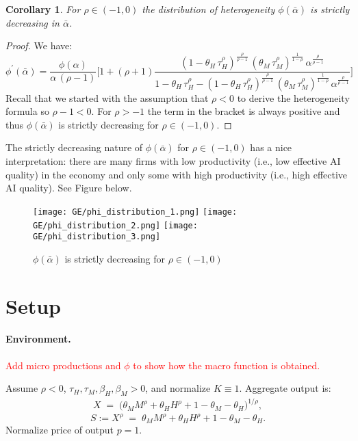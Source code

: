 \documentclass[english]{article}
\newtheorem{corollary}{Corollary}
\begin{document}
\begin{corollary}
For $\rho \in (-1,0)$ the distribution of heterogeneity $\phi(\bar{\alpha})$ is strictly decreasing in $\bar{\alpha}$. 
\end{corollary}

\begin{proof}
We have:
\[
\phi^{'}(\bar{\alpha}) = \frac{\phi(\alpha)}{\alpha\,(\rho-1)}\Big[1+(\rho+1)\frac{(1-\theta_H\,\tau_H^\rho)^\frac{\rho}{\rho-1}\,(\theta_M\,\tau_M^\rho)^{\frac{1}{1-\rho}}\,\alpha^{\frac{\rho}{\rho-1}}}{1-\theta_H\,\tau_H^\rho-(1-\theta_H\,\tau_H^\rho)^\frac{\rho}{\rho-1}\,(\theta_M\,\tau_M^\rho)^{\frac{1}{1-\rho}}\,\alpha^{\frac{\rho}{\rho-1}}}\Big]
\]
Recall that we started with the assumption that $\rho < 0$ to derive the heterogeneity formula so $\rho - 1 < 0$.
For $\rho > -1$ the term in the bracket is always positive and thus $\phi(\bar{\alpha})$ is strictly decreasing for $\rho \in (-1,0)$.
\end{proof}

The strictly decreasing nature of $\phi(\bar{\alpha})$ for $\rho \in (-1,0)$ has a nice interpretation: there are many firms with low productivity (i.e., low effective AI quality) in the economy and only some with high productivity (i.e., high effective AI quality). See Figure below.

\begin{figure}[h!]
    \centering
    \caption{$\phi(\bar{\alpha})$ is strictly decreasing for $\rho \in (-1,0)$}
    \texttt{[image: GE/phi\_distribution\_1.png]}
    \texttt{[image: GE/phi\_distribution\_2.png]}
    \texttt{[image: GE/phi\_distribution\_3.png]}
\end{figure}



\section*{Setup}

\paragraph{Environment.}
\textcolor{red}{Add micro productions and $\phi$ to show how the macro function is obtained.}

Assume $\rho<0$, $\tau_H,\tau_M,\beta_H,\beta_M>0$, and normalize $K\equiv1$.
Aggregate output is:
\begin{align}
X \;=\; \Big(\theta_M M^\rho+\theta_H H^\rho+1-\theta_M-\theta_H\Big)^{1/\rho}, 
\end{align}
\[
S:=X^\rho \;=\; \theta_M M^\rho+\theta_H H^\rho+1-\theta_M-\theta_H.
\]
Normalize price of output $p=1$.
\end{document}
